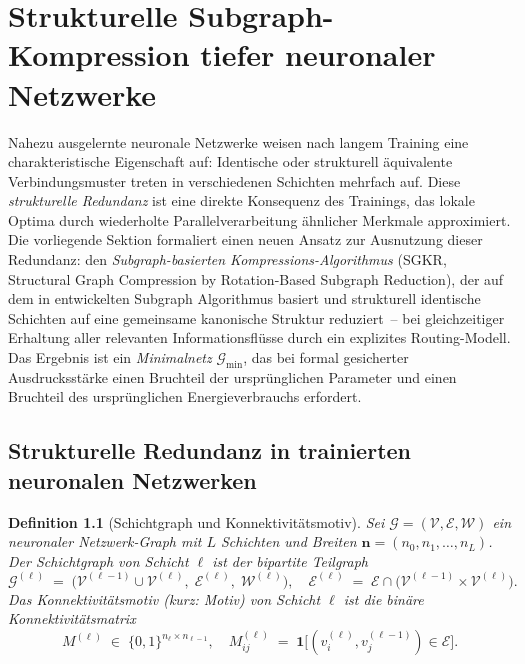 ﻿\documentclass[12pt, a4paper, openany]{report}
\newtheorem{definition}[theorem]{Definition}
\newcommand{\calG}{\mathcal{G}}
\newcommand{\calV}{\mathcal{V}}
\newcommand{\calE}{\mathcal{E}}
\newcommand{\calW}{\mathcal{W}}
\begin{document}
\chapter{Strukturelle Subgraph-Kompression tiefer neuronaler Netzwerke}
\label{sec:subgraph_compression}

Nahezu ausgelernte neuronale Netzwerke weisen nach langem Training eine
charakteristische Eigenschaft auf: Identische oder strukturell äquivalente
Verbindungsmuster treten in verschiedenen Schichten mehrfach auf.  Diese
\emph{strukturelle Redundanz} ist eine direkte Konsequenz des Trainings,
das lokale Optima durch wiederholte Parallelverarbeitung ähnlicher Merkmale
approximiert.  Die vorliegende Sektion formaliert einen neuen Ansatz zur
Ausnutzung dieser Redundanz: den \emph{Subgraph-basierten
Kompressions-Algorithmus} (SGKR, Structural Graph Compression by
Rotation-Based Subgraph Reduction), der auf dem in \cite{epp2026subgraph} entwickelten
Subgraph Algorithmus basiert und strukturell identische Schichten auf eine
gemeinsame kanonische Struktur reduziert~-- bei gleichzeitiger Erhaltung
aller relevanten Informationsflüsse durch ein explizites Routing-Modell.
Das Ergebnis ist ein \emph{Minimal\-netz} $\calG_{\min}$, das bei
formal gesicherter Ausdrucksstärke einen Bruchteil der ursprünglichen
Parameter und einen Bruchteil des ursprünglichen Energieverbrauchs erfordert.

\section{Strukturelle Redundanz in trainierten neuronalen Netzwerken}
\label{sec:sgkr_motivation}

\begin{definition}[Schichtgraph und Konnektivitätsmotiv]
\label{def:layer_motif}
Sei $\calG = (\calV, \calE, \calW)$ ein neuronaler Netzwerk-Graph mit
$L$ Schichten und Breiten $\bm{n} = (n_0, n_1, \ldots, n_L)$.  Der
\emph{Schichtgraph} von Schicht $\ell$ ist der bipartite Teilgraph
\[
  \calG^{(\ell)}
  \;=\;
  \bigl(\calV^{(\ell-1)} \cup \calV^{(\ell)},\;
        \calE^{(\ell)},\;
        \calW^{(\ell)}\bigr),
  \quad
  \calE^{(\ell)} \;=\; \calE \cap \bigl(\calV^{(\ell-1)} \times \calV^{(\ell)}\bigr).
\]
Das \emph{Konnektivitätsmotiv} (kurz: \emph{Motiv}) von Schicht $\ell$ ist
die binäre Konnektivitäts\-matrix
\[
  M^{(\ell)} \;\in\; \{0,1\}^{n_\ell \times n_{\ell-1}},
  \quad
  M^{(\ell)}_{ij} \;=\; \mathbf{1}\bigl[(v_i^{(\ell)}, v_j^{(\ell-1)}) \in \calE\bigr].
\]
\end{definition}
\end{document}
